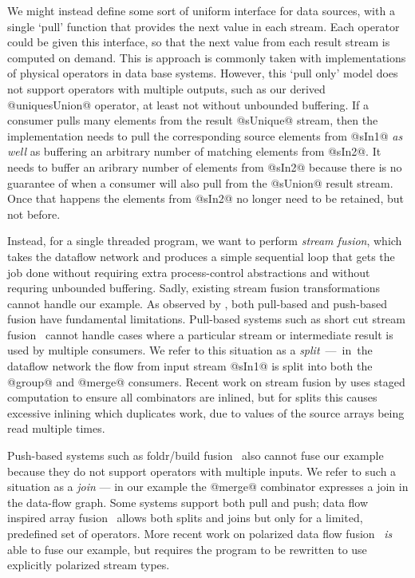 We might instead define some sort of uniform interface for data sources, with a single `pull' function that provides the next value in each stream. Each operator could be given this interface, so that the next value from each result stream is computed on demand. This is approach is commonly taken with implementations of physical operators in data base systems. However, this `pull only' model does not support operators with multiple outputs, such as our derived @uniquesUnion@ operator, at least not without unbounded buffering. If a consumer pulls many elements from the result @sUnique@ stream, then the implementation needs to pull the corresponding source elements from @sIn1@ \emph{as well} as buffering an arbitrary number of matching elements from @sIn2@. It needs to buffer an aribrary number of elements from @sIn2@ because there is no guarantee of when a consumer will also pull from the @sUnion@ result stream. Once that happens the elements from @sIn2@ no longer need to be retained, but not before.

Instead, for a single threaded program, we want to perform \emph{stream fusion}, which takes the dataflow network and produces a simple sequential loop that gets the job done without requiring extra process-control abstractions and without requring unbounded buffering. Sadly, existing stream fusion transformations cannot handle our example. As observed by \citet{kay2009you}, both pull-based and push-based fusion have fundamental limitations. Pull-based systems such as short cut stream fusion~\cite{coutts2007stream} cannot handle cases where a particular stream or intermediate result is used by multiple consumers. We refer to this situation as a \mbox{\emph{split} --- in the} dataflow network the flow from input stream @sIn1@ is split into both the @group@ and @merge@ consumers. Recent work on stream fusion by \citet{kiselyov2016stream} uses staged computation to ensure all combinators are inlined, but for splits this causes excessive inlining which duplicates work, due to values of the source arrays being read multiple times.

Push-based systems such as foldr/build fusion~\cite{gill1993short} also cannot fuse our example because they do not support operators with multiple inputs. We refer to such a situation as a \emph{join} --- in our example the @merge@ combinator expresses a join in the data-flow graph. Some systems support both pull and push; data flow inspired array fusion~\cite{lippmeier2013data} allows both splits and joins but only for a limited, predefined set of operators. More recent work on polarized data flow fusion~\cite{lippmeier2016polarized} \emph{is} able to fuse our example, but requires the program to be rewritten to use explicitly polarized stream types. 

